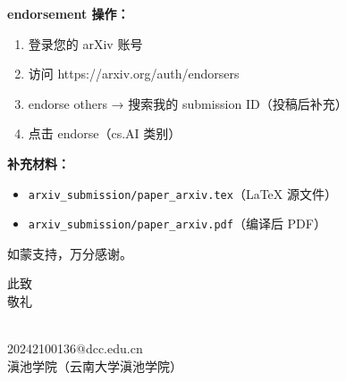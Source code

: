 \documentclass[11pt]{article}
\begin{document}
\vspace{0.2cm}

\noindent\textbf{endorsement 操作：}
\begin{enumerate}
\item 登录您的 arXiv 账号
\item 访问 https://arxiv.org/auth/endorsers
\item endorse others → 搜索我的 submission ID（投稿后补充）
\item 点击 endorse（cs.AI 类别）
\end{enumerate}

\vspace{0.2cm}

\noindent\textbf{补充材料：}
\begin{itemize}
\item \texttt{arxiv\_submission/paper\_arxiv.tex}（LaTeX 源文件）
\item \texttt{arxiv\_submission/paper\_arxiv.pdf}（编译后 PDF）
\end{itemize}

\vspace{0.2cm}

\noindent 如蒙支持，万分感谢。

\vspace{0.3cm}

\noindent 此致 \\
敬礼

\vspace{0.3cm}

\noindent [你的名字] \\
20242100136@dcc.edu.cn \\
滇池学院（云南大学滇池学院）
\end{document}
